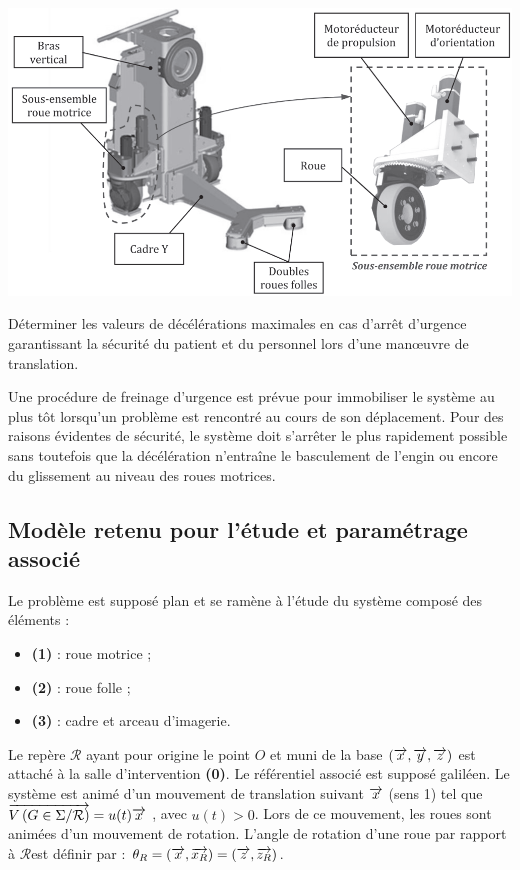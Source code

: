 \documentclass[10pt,fleqn]{article} %
\begin{document}
\begin{multicols}{2}
\begin{center}
\includegraphics[width=.95\linewidth]{images/fig_03}
\end{center}

\begin{obj}
Déterminer les valeurs de décélérations maximales en cas d’arrêt d’urgence garantissant la
sécurité du patient et du personnel lors d’une man\oe{}uvre de translation.
\end{obj}

Une procédure de freinage d’urgence est prévue pour immobiliser le système au plus tôt lorsqu’un
problème est rencontré au cours de son déplacement. Pour des raisons évidentes de sécurité, le système
doit s’arrêter le plus rapidement possible sans toutefois que la décélération n’entraîne le basculement
de l’engin ou encore du glissement au niveau des roues motrices.


\subsection*{Modèle retenu pour l’étude et paramétrage associé}

Le problème est supposé plan et se ramène à l’étude
du système composé des éléments :
\begin{itemize}
\item \textbf{(1)} : roue motrice ;
\item \textbf{(2)} : roue folle ;
\item \textbf{(3)} : cadre et arceau d’imagerie.
\end{itemize}
Le repère $\mathcal{R}$ ayant pour origine le point $O$ et muni de la
base $\left(\overrightarrow{x},\overrightarrow{y},\overrightarrow{z} \right)$ est attaché à la salle d’intervention \textbf{(0)}.
Le référentiel associé est supposé galiléen.
Le système est animé d’un mouvement de translation
suivant $\overrightarrow{x}$ (sens 1) tel que $\overrightarrow{V\left( {G} \in {\Sigma}/{\mathcal{R}}\right)}= u(t)\overrightarrow{x}$ , avec
$u(t) > 0$.
Lors de ce mouvement, les roues sont animées d’un
mouvement de rotation. L’angle de rotation d’une roue
par rapport à 
$\mathcal{R}$est définir par :
$\theta_R = \left(\overrightarrow{x},\overrightarrow{x_R}\right) = \left(\overrightarrow{z},\overrightarrow{z_R}\right)$.


\end{multicols}
\end{document}
